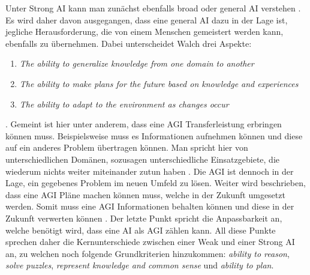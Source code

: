             Unter Strong AI kann man zunächst ebenfalls broad oder general AI verstehen \cite{walch_world_2019}. Es wird
            daher davon ausgegangen, dass eine general AI dazu in der Lage ist, jegliche Herausforderung, die von einem
            Menschen gemeistert werden kann, ebenfalls zu übernehmen. Dabei unterscheidet Walch drei Aspekte:
            \begin{enumerate}
                \item \textit{The ability to generalize knowledge from one domain to another}
                \item \textit{The ability to make plans for the future based on knowledge and experiences}
                \item \textit{The ability to adapt to the environment as changes occur}
            \end{enumerate}
            \cite{walch_world_2019}.
            Gemeint ist hier unter anderem, dass eine AGI Transferleistung erbringen können muss. Beispielsweise muss
            es Informationen aufnehmen können und diese auf ein anderes Problem übertragen können. Man spricht hier von
            unterschiedlichen Domänen, sozusagen unterschiedliche Einsatzgebiete, die wiederum nichts weiter miteinander
            zutun haben \cite{walch_world_2019}. Die AGI ist dennoch in der Lage, ein gegebenes Problem im neuen Umfeld
            zu lösen. Weiter wird beschrieben, dass eine AGI Pläne machen können muss, welche in der Zukunft umgesetzt
            werden. Somit muss eine AGI Informationen behalten können und diese in der Zukunft verwerten können
            \cite{walch_world_2019}. Der letzte Punkt spricht die Anpassbarkeit an, welche benötigt wird, dass eine AI
            als AGI zählen kann. All diese Punkte sprechen daher die Kernunterschiede zwischen einer Weak und einer
            Strong AI an, zu welchen noch folgende Grundkriterien hinzukommen: \textit{ability to reason},
            \textit{solve puzzles}, \textit{represent knowledge and common sense} und \textit{ability to plan}.

